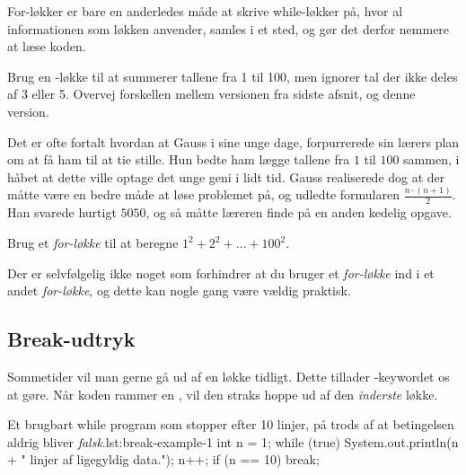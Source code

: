         For-løkker er bare en anderledes måde at skrive while-løkker
        på, hvor al informationen som løkken anvender, samles i et
        sted, og gør det derfor nemmere at læse koden.

		\begin{exercise}
            Brug en -løkke til at summerer tallene
            fra 1 til 100, men ignorer tal der ikke deles af 3 eller
            5. Overvej forskellen mellem  versionen
            fra sidste afsnit, og denne version.
        \end{exercise}

		\begin{exercise}
			Det er ofte fortalt hvordan at Gauss i sine unge dage, forpurrerede sin
			lærers plan om at få ham til at tie stille. Hun bedte ham lægge tallene
			fra \(1\) til \(100\) sammen, i håbet at dette ville optage det unge
			geni i lidt tid. Gauss realiserede dog at der måtte være en bedre måde
			at løse problemet på, og udledte formularen \(\frac{n\cdot(n+1)}{2}\).
			Han svarede hurtigt \(5050\), og så måtte læreren finde på en anden
			kedelig opgave.

			Brug et \emph{for-løkke} til at beregne \(1^2+2^2+\dots+100^2\).
		\end{exercise}

		\begin{exercise}
			Der er selvfølgelig ikke noget som forhindrer at du bruger et
			\emph{for-løkke} ind i et andet \emph{for-løkke}, og dette kan nogle gang
			være vældig praktisk.

			\todo{Find på opgave!}
		\end{exercise}

	\subsection{Break-udtryk}

		Sommetider vil man gerne gå ud af en løkke tidligt. Dette tillader
        -keywordet os at gøre. Når koden rammer en
        , vil den straks hoppe ud af den
        \emph{inderste} løkke.

        \begin{JavaCode}{Et brugbart while program som stopper efter 10 linjer, på trods af at betingelsen aldrig bliver \emph{falsk}.}{lst:break-example-1}
			int n = 1;
			while (true) {
				System.out.println(n + " linjer af ligegyldig data.");
				n++;
				if (n == 10)  break;
			}
		\end{JavaCode}

